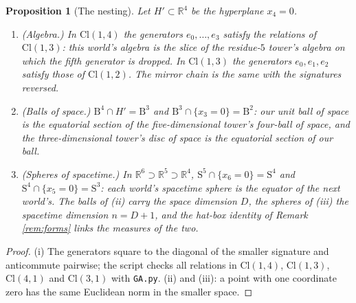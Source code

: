 \documentclass[11pt]{article}
\newtheorem{proposition}[theorem]{Proposition}
\theoremstyle{definition}
\newcommand{\Cl}{\mathrm{Cl}}
\newcommand{\R}{\mathbb{R}}
\newcommand{\B}{\mathrm{B}}
\newcommand{\Sph}{\mathrm{S}}
\begin{document}
\begin{proposition}[The nesting]\label{prop:nesting}
Let $H' \subset \R^{4}$ be the hyperplane $x_{4} = 0$.
\begin{enumerate}
\item[(i)] (Algebra.) In $\Cl(1,4)$ the generators $e_{0}, \ldots, e_{3}$ satisfy the relations of $\Cl(1,3)$: this world's algebra is the slice of the residue-$5$ tower's algebra on which the fifth generator is dropped. In $\Cl(1,3)$ the generators $e_{0}, e_{1}, e_{2}$ satisfy those of $\Cl(1,2)$. The mirror chain is the same with the signatures reversed.
\item[(ii)] (Balls of space.) $\B^{4} \cap H' = \B^{3}$ and $\B^{3} \cap \{x_{3} = 0\} = \B^{2}$: our unit ball of space is the equatorial section of the five-dimensional tower's four-ball of space, and the three-dimensional tower's disc of space is the equatorial section of our ball.
\item[(iii)] (Spheres of spacetime.) In $\R^{6} \supset \R^{5} \supset \R^{4}$, $\Sph^{5} \cap \{x_{6} = 0\} = \Sph^{4}$ and $\Sph^{4} \cap \{x_{5} = 0\} = \Sph^{3}$: each world's spacetime sphere is the equator of the next world's. The balls of (ii) carry the space dimension $D$, the spheres of (iii) the spacetime dimension $n = D + 1$, and the hat-box identity of Remark \ref{rem:forms} links the measures of the two.
\end{enumerate}
\end{proposition}

\begin{proof}
(i) The generators square to the diagonal of the smaller signature and anticommute pairwise; the script checks all relations in $\Cl(1,4)$, $\Cl(1,3)$, $\Cl(4,1)$ and $\Cl(3,1)$ with \texttt{GA.py}. (ii) and (iii): a point with one coordinate zero has the same Euclidean norm in the smaller space.
\end{proof}
\end{document}
